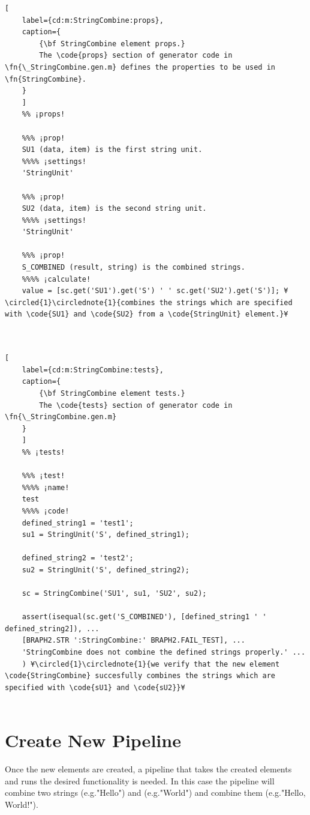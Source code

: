 \documentclass{tufte-handout}
\begin{document}
\begin{lstlisting}[
	label={cd:m:StringCombine:props},
	caption={
		{\bf StringCombine element props.}
		The \code{props} section of generator code in \fn{\_StringCombine.gen.m} defines the properties to be used in \fn{StringCombine}.
	}
	]
	%% ¡props!
	
	%%% ¡prop!
	SU1 (data, item) is the first string unit.
	%%%% ¡settings!
	'StringUnit'
	
	%%% ¡prop!
	SU2 (data, item) is the second string unit.
	%%%% ¡settings!
	'StringUnit'
	
	%%% ¡prop!
	S_COMBINED (result, string) is the combined strings.
	%%%% ¡calculate!
	value = [sc.get('SU1').get('S') ' ' sc.get('SU2').get('S')]; ¥\circled{1}\circlednote{1}{combines the strings which are specified with \code{SU1} and \code{SU2} from a \code{StringUnit} element.}¥
	
	
\end{lstlisting}

\begin{lstlisting}[
	label={cd:m:StringCombine:tests},
	caption={
		{\bf StringCombine element tests.}
		The \code{tests} section of generator code in \fn{\_StringCombine.gen.m}
	}
	]
	%% ¡tests!
	
	%%% ¡test!
	%%%% ¡name!
	test
	%%%% ¡code!
	defined_string1 = 'test1';
	su1 = StringUnit('S', defined_string1);
	
	defined_string2 = 'test2';
	su2 = StringUnit('S', defined_string2);
	
	sc = StringCombine('SU1', su1, 'SU2', su2);
	
	assert(isequal(sc.get('S_COMBINED'), [defined_string1 ' ' defined_string2]), ...
	[BRAPH2.STR ':StringCombine:' BRAPH2.FAIL_TEST], ...
	'StringCombine does not combine the defined strings properly.' ...
	) ¥\circled{1}\circlednote{1}{we verify that the new element \code{StringCombine} succesfully combines the strings which are specified with \code{sU1} and \code{sU2}}¥
	
\end{lstlisting}

\clearpage
\section{Create New Pipeline}

Once the new elements are created, a pipeline that takes the created elements and runs the desired functionality is needed. In this case the pipeline will combine two strings (e.g."Hello") and (e.g."World") and combine them  (e.g."Hello, World!").
\end{document}
